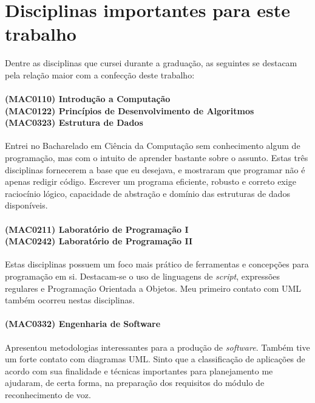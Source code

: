 \chapter*{Disciplinas importantes para este trabalho}

Dentre as disciplinas que cursei durante a graduação, as seguintes se destacam pela relação maior com a confecção deste trabalho:

\subsubsection{(MAC0110) Introdução a Computação \\
(MAC0122) Princípios de Desenvolvimento de Algoritmos \\
(MAC0323) Estrutura de Dados}

Entrei no Bacharelado em Ciência da Computação sem conhecimento algum de programação, mas com o intuito de aprender bastante sobre o assunto. Estas três disciplinas fornecerem a base que eu desejava, e mostraram que programar não é apenas redigir código. Escrever um programa eficiente, robusto e correto exige raciocínio lógico, capacidade de abstração e domínio das estruturas de dados disponíveis.

\subsubsection{(MAC0211) Laboratório de Programação I \\
(MAC0242) Laboratório de Programação II}

Estas disciplinas possuem um foco mais prático de ferramentas e concepções para programação em si. Destacam-se o uso de linguagens de \textit{script}, expressões regulares e Programação Orientada a Objetos. Meu primeiro contato com UML também ocorreu nestas disciplinas.

\subsubsection{(MAC0332) Engenharia de Software}

Apresentou metodologias interessantes para a produção de \textit{software}. Também tive um forte contato com diagramas UML. Sinto que a classificação de aplicações de acordo com sua finalidade e técnicas importantes para planejamento me ajudaram, de certa forma, na preparação dos requisitos do módulo de reconhecimento de voz.

